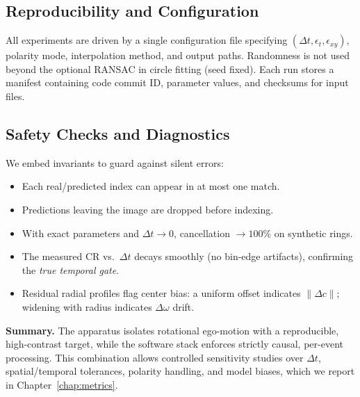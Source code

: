 \subsection{Reproducibility and Configuration}
All experiments are driven by a single configuration file specifying $(\Delta t,\epsilon_t,\epsilon_{xy})$, polarity mode, interpolation method, and output paths. Randomness is not used beyond the optional RANSAC in circle fitting (seed fixed). Each run stores a manifest containing code commit ID, parameter values, and checksums for input files.

\subsection{Safety Checks and Diagnostics}
We embed invariants to guard against silent errors:
\begin{itemize}
  \item Each real/predicted index can appear in at most one match.
  \item Predictions leaving the image are dropped before indexing.
  \item With exact parameters and $\Delta t\to 0$, cancellation $\to 100\%$ on synthetic rings.
  \item The measured CR vs.\ $\Delta t$ decays smoothly (no bin-edge artifacts), confirming the \emph{true temporal gate}.
  \item Residual radial profiles flag center bias: a uniform offset indicates $\|\Delta c\|$; widening with radius indicates $\Delta\omega$ drift.
\end{itemize}

\medskip
\noindent\textbf{Summary.} The apparatus isolates rotational ego-motion with a reproducible, high-contrast target, while the software stack enforces strictly causal, per-event processing. This combination allows controlled sensitivity studies over $\Delta t$, spatial/temporal tolerances, polarity handling, and model biases, which we report in Chapter~\ref{chap:metrics}.
